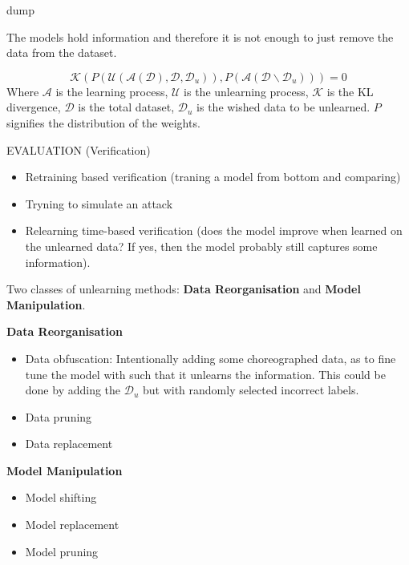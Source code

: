 \begin{definition}
    dump
\end{definition}

The models hold information and therefore it is not enough to just remove the data from the dataset. 





\[
    \mathcal{K}(P(\mathcal{U}(\mathcal{A}(\mathcal{D}),\mathcal{D},\mathcal{D}_u)), 
    P(\mathcal{A}(\mathcal{D}\backslash\mathcal{D}_u)))=0
\]
Where $\mathcal{A}$ is the learning process, $\mathcal{U}$ is the unlearning process, $\mathcal{K}$ is the KL divergence, $\mathcal{D}$ is the total dataset, $\mathcal{D}_u$ is the wished data to be unlearned. $P$ signifies the distribution of the weights.





EVALUATION (Verification)
\begin{itemize}
    \item Retraining based verification (traning a model from bottom and comparing)
    \item Tryning to simulate an attack
    \item Relearning time-based verification (does the model improve when learned on the unlearned data? If yes, then the model probably still captures some information).
\end{itemize}



Two classes of unlearning methods: \textbf{Data Reorganisation} and \textbf{Model Manipulation}.

\textbf{Data Reorganisation}
\begin{itemize}
    \item Data obfuscation: Intentionally adding some choreographed data, as to fine tune the model with such that it unlearns the information. This could be done by adding the $\mathcal{D}_u$ but with randomly selected incorrect labels.
    \item Data pruning
    \item Data replacement
\end{itemize}

\textbf{Model Manipulation}
\begin{itemize}
    \item Model shifting
    \item Model replacement 
    \item Model pruning
\end{itemize}






